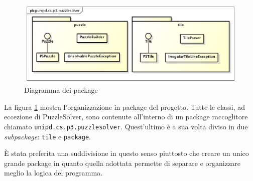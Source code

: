 \documentclass[a4paper, 12pt]{article}
\begin{document}
      \begin{figure}[H]

        \centering
        \includegraphics[scale=0.5]{uml/packages.png}
        \caption{Diagramma dei package}
        \label{uml:packages}

      \end{figure}

      La figura \ref{uml:packages} mostra l'organizzazione in package del progetto. Tutte le classi, ad eccezione di PuzzleSolver, sono contenute all'interno di un package raccoglitore chiamato \verb|unipd.cs.p3.puzzlesolver|. Quest'ultimo è a sua volta diviso in due \emph{subpackage}: \verb|tile| e \verb|package|.

      È stata preferita una suddivisione in questo senso piuttosto che creare un unico grande package in quanto quella adottata permette di separare e organizzare meglio la logica del programma.
\end{document}
